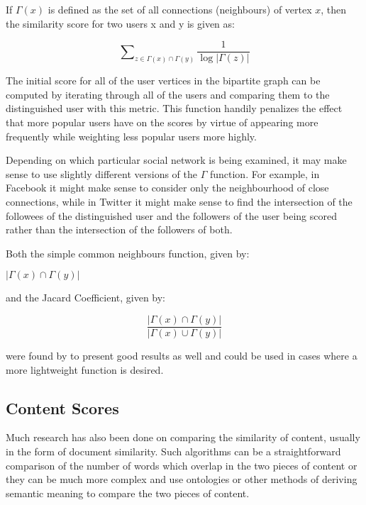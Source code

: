 If $\Gamma (x)$ is defined as the set of all connections (neighbours) of vertex $x$, then the similarity score for two users x and y is given as: 

\begin{center}
\[
\sum\nolimits_{z \in \Gamma (x) \cap \Gamma (y)} \frac{1}{\log |\Gamma (z) |}
\]
\end{center}

The initial score for all of the user vertices in the bipartite graph can be computed by iterating through all of the users and comparing them to the distinguished user with this metric. This function handily penalizes the effect that more popular users have on the scores by virtue of appearing more frequently while weighting less popular users more highly.

Depending on which particular social network is being examined, it may make sense to use slightly different versions of the $\Gamma$ function. For example, in Facebook it might make sense to consider only the neighbourhood of close connections, while in Twitter it might make sense to find the intersection of the followees of the distinguished user and the followers of the user being scored rather than the intersection of the followers of both.

Both the simple common neighbours function, given by:
\begin{center}
$| \Gamma (x) \cap \Gamma (y) |$
\end{center}

\noindent
and the Jacard Coefficient, given by:

\begin{center}
\[
\frac{| \Gamma (x) \cap \Gamma (y) |}{| \Gamma (x) \cup \Gamma (y) |}
\]
\end{center}

\noindent
were found by \cite{LibenNowell2007} to present good results as well and could be used in cases where a more lightweight function is desired.

\subsection{Content Scores}
\label{sec:ContentScoringMethod}

Much research has also been done on comparing the similarity of content, usually in the form of document similarity. Such algorithms can be a straightforward comparison of the number of words which overlap in the two pieces of content or they can be much more complex and use ontologies or other methods of deriving semantic meaning to compare the two pieces of content.

